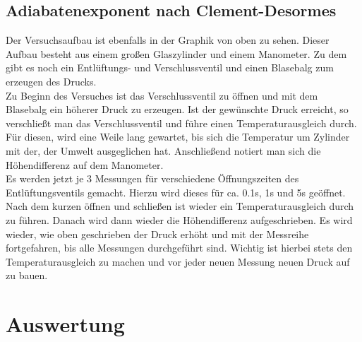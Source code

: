 \documentclass[12pt,a4paper,titlepage,headinclude,bibtotoc]{scrartcl}
\begin{document}
\subsection{Adiabatenexponent nach Clement-Desormes}
Der Versuchsaufbau ist ebenfalls in der Graphik %
von oben zu sehen.
Dieser Aufbau besteht aus einem großen Glaszylinder und einem Manometer.
Zu dem gibt es noch ein Entlüftungs- und Verschlussventil und einen Blasebalg zum erzeugen des Drucks.\\
Zu Beginn des Versuches ist das Verschlussventil zu öffnen und mit dem Blasebalg ein höherer Druck zu erzeugen.
Ist der gewünschte Druck erreicht, so verschließt man das Verschlussventil und führe einen Temperaturausgleich durch.
Für diesen, wird eine Weile lang gewartet, bis sich die Temperatur um Zylinder mit der, der Umwelt ausgeglichen hat.
Anschließend notiert man sich die Höhendifferenz auf dem Manometer.\\
Es werden jetzt je 3 Messungen für verschiedene Öffnungszeiten des Entlüftungsventils gemacht.
Hierzu wird dieses für ca. 0.1s, 1s und 5s geöffnet.
Nach dem kurzen öffnen und schließen ist wieder ein Temperaturausgleich durch zu führen.
Danach wird dann wieder die Höhendifferenz aufgeschrieben.
Es wird wieder, wie oben geschrieben der Druck erhöht und mit der Messreihe fortgefahren, bis alle Messungen durchgeführt sind.
Wichtig ist hierbei stets den Temperaturausgleich zu machen und vor jeder neuen Messung neuen Druck auf zu bauen.

\section{Auswertung}
\label{sec:auswertung}
\end{document}
